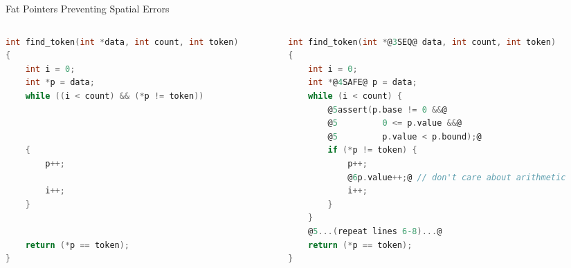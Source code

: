 \documentclass[aspectratio=169]{beamer}
\begin{document}
\begin{frame}[fragile]{Fat Pointers Preventing Spatial Errors}
    \begin{columns}[T]
      \begin{column}{0.48\textwidth}
\begin{lstlisting}[language=C,mathescape,basicstyle={\tiny\ttfamily}]
int find_token(int *data, int count, int token)
{
    int i = 0;
    int *p = data;
    while ((i < count) && (*p != token))
    


    {
        p++;

        i++;
    }


    return (*p == token);
}
\end{lstlisting}
\end{column}

\pause

\begin{column}{0.48\textwidth}

\begin{lstlisting}[language=C,mathescape,basicstyle={\tiny\ttfamily},
    moredelim={**[is][\btHL<3>]{@3}{@}},
    moredelim={**[is][{\btHL<4>}]{@4}{@}},
    moredelim={**[is][{\btHL<5>}]{@5}{@}},
    moredelim={**[is][{\btHL<6>}]{@6}{@}}
]
int find_token(int *@3SEQ@ data, int count, int token)
{
    int i = 0;
    int *@4SAFE@ p = data;
    while (i < count) {
        @5assert(p.base != 0 &&@
        @5         0 <= p.value &&@
        @5         p.value < p.bound);@
        if (*p != token) {
            p++;
            @6p.value++;@ // don't care about arithmetic
            i++;
        }
    }
    @5...(repeat lines 6-8)...@
    return (*p == token);
}
\end{lstlisting}
\end{column}

\end{columns}
\end{frame}
\end{document}
